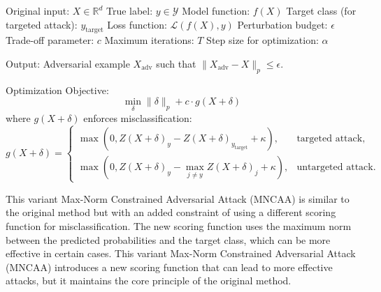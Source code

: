 Original input: $X \in \mathbb{R}^d$
True label: $y \in \mathcal{Y}$
Model function: $f(X)$
Target class (for targeted attack): $y_{\text{target}}$
Loss function: $\mathcal{L}(f(X), y)$
Perturbation budget: $\epsilon$
Trade-off parameter: $c$
Maximum iterations: $T$
Step size for optimization: $\alpha$

Output: Adversarial example $X_{\text{adv}}$ such that $\|X_{\text{adv}} - X\|_p \leq \epsilon$.

Optimization Objective:
    \[
    \min_{\delta} \|\delta\|_p + c \cdot g(X + \delta)
    \]
    where $g(X + \delta)$ enforces misclassification:
    \[
    g(X + \delta) = 
    \begin{cases} 
    \max(0, Z(X + \delta)_y - Z(X + \delta)_{y_{\text{target}}} + \kappa), & \text{targeted attack}, \\
    \max(0, Z(X + \delta)_y - \max_{j \neq y} Z(X + \delta)_j + \kappa), & \text{untargeted attack}.
    \end{cases}
    \]

This variant Max-Norm Constrained Adversarial Attack (MNCAA) is similar to the original method but with an added constraint of using a different scoring function for misclassification. The new scoring function uses the maximum norm between the predicted probabilities and the target class, which can be more effective in certain cases.
This variant Max-Norm Constrained Adversarial Attack (MNCAA) introduces a new scoring function that can lead to more effective attacks, but it maintains the core principle of the original method.